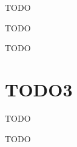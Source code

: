 \documentclass{beamer}
\begin{document}
\begin{frame}
TODO
\end{frame}



\begin{frame}
TODO
\end{frame}



\begin{frame}
TODO
\end{frame}


\section{TODO3}


\begin{frame}
TODO
\end{frame}



\begin{frame}
TODO
\end{frame}
\end{document}
